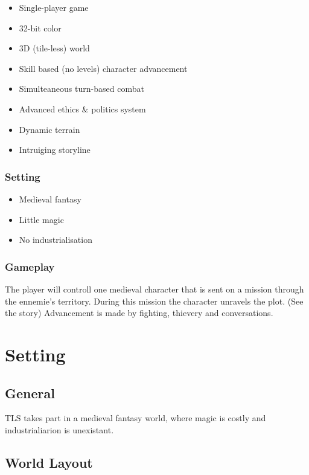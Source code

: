 \documentclass[a4paper]{report}
\begin{document}
			\begin{itemize}
				\item Single-player game
				\item 32-bit color
				\item 3D (tile-less) world
				\item Skill based (no levels) character advancement
				\item Simulteaneous turn-based combat
				\item Advanced ethics \& politics system
				\item Dynamic terrain
				\item Intruiging storyline
			\end{itemize}

		\section{Setting}\label{setting}

			\begin{itemize}
				\item Medieval fantasy
				\item Little magic
				\item No industrialisation
			\end{itemize}

		\section{Gameplay}

			The player will controll one medieval character that is sent on a mission through the ennemie's territory. During this mission the character unravels the plot. (See the story) Advancement is made by fighting, thievery and conversations.

\part{Setting}

	\chapter{General}

		TLS takes part in a medieval fantasy world, where magic is costly and industrialiarion is unexistant.

	\chapter{World Layout}
\end{document}
